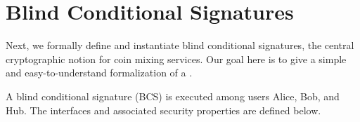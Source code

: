 \section{Blind Conditional Signatures}\label{sec:bcs-defs}

Next, we formally define and instantiate blind conditional signatures, the central cryptographic notion for coin mixing services. 
Our goal here is to give a simple and easy-to-understand formalization of a \syncpuzzle. 

A blind conditional signature (BCS) is executed among users Alice, Bob, and Hub. The interfaces and associated security properties are defined below.

